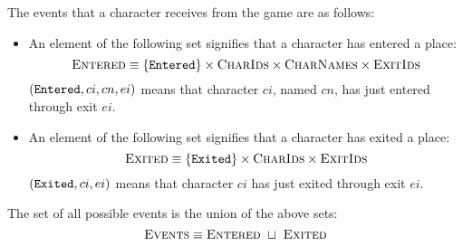 The events that a character receives from the game are as follows:
\begin{itemize}
\item An element of the following set signifies that a character has
  entered a place:
  \[ \textsc{Entered} \equiv \{ \texttt{Entered} \} \times \textsc{CharIds} \times
  \textsc{CharNames} \times \textsc{ExitIds} \]
  $(\texttt{Entered}, ci, cn, ei )$ means that character $ci$, named $cn$,
  has just entered through exit $ei$.
\item An element of the following set signifies that a character has
  exited a place:
  \[ \textsc{Exited} \equiv \{ \texttt{Exited} \} \times \textsc{CharIds} \times
  \textsc{ExitIds} \]
  $(\texttt{Exited}, ci, ei )$ means that character $ci$
  has just exited through exit $ei$.
\end{itemize}
The set of all possible events is the union of the above sets:
\begin{equation}
  \textsc{Events} \equiv \textsc{Entered} ~\sqcup~ \textsc{Exited}
\end{equation}
